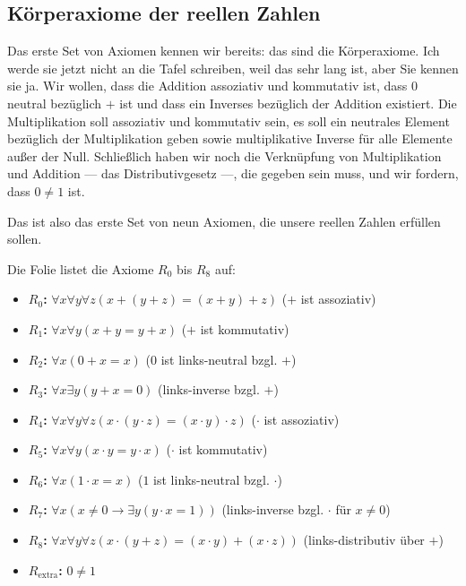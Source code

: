 \subsection{Körperaxiome der reellen Zahlen}
\begin{spoken-clean}[00:14:40 - 00:15:56]
Das erste Set von Axiomen kennen wir bereits: das sind die Körperaxiome. Ich werde sie jetzt nicht an die Tafel schreiben, weil das sehr lang ist, aber Sie kennen sie ja. Wir wollen, dass die Addition assoziativ und kommutativ ist, dass $0$ neutral bezüglich $+$ ist und dass ein Inverses bezüglich der Addition existiert. Die Multiplikation soll assoziativ und kommutativ sein, es soll ein neutrales Element bezüglich der Multiplikation geben sowie multiplikative Inverse für alle Elemente außer der Null. Schließlich haben wir noch die Verknüpfung von Multiplikation und Addition --- das Distributivgesetz ---, die gegeben sein muss, und wir fordern, dass $0 \neq 1$ ist.

Das ist also das erste Set von neun Axiomen, die unsere reellen Zahlen erfüllen sollen.
\end{spoken-clean}

\begin{meta-note}
Die Folie listet die Axiome $R_0$ bis $R_8$ auf:
\begin{itemize}
    \item \textbf{$R_0$:} $\forall x \forall y \forall z (x + (y + z) = (x + y) + z)$ ($+$ ist assoziativ)
    \item \textbf{$R_1$:} $\forall x \forall y (x + y = y + x)$ ($+$ ist kommutativ)
    \item \textbf{$R_2$:} $\forall x (0 + x = x)$ ($0$ ist links-neutral bzgl. $+$)
    \item \textbf{$R_3$:} $\forall x \exists y (y + x = 0)$ (links-inverse bzgl. $+$)
    \item \textbf{$R_4$:} $\forall x \forall y \forall z (x \cdot (y \cdot z) = (x \cdot y) \cdot z)$ ($\cdot$ ist assoziativ)
    \item \textbf{$R_5$:} $\forall x \forall y (x \cdot y = y \cdot x)$ ($\cdot$ ist kommutativ)
    \item \textbf{$R_6$:} $\forall x (1 \cdot x = x)$ ($1$ ist links-neutral bzgl. $\cdot$)
    \item \textbf{$R_7$:} $\forall x (x \neq 0 \to \exists y (y \cdot x = 1))$ (links-inverse bzgl. $\cdot$ für $x \neq 0$)
    \item \textbf{$R_8$:} $\forall x \forall y \forall z (x \cdot (y + z) = (x \cdot y) +(x \cdot z))$ (links-distributiv über $+$)
    \item \textbf{$R_{\text{extra}}$:} $0 \neq 1$
\end{itemize}
\end{meta-note}

